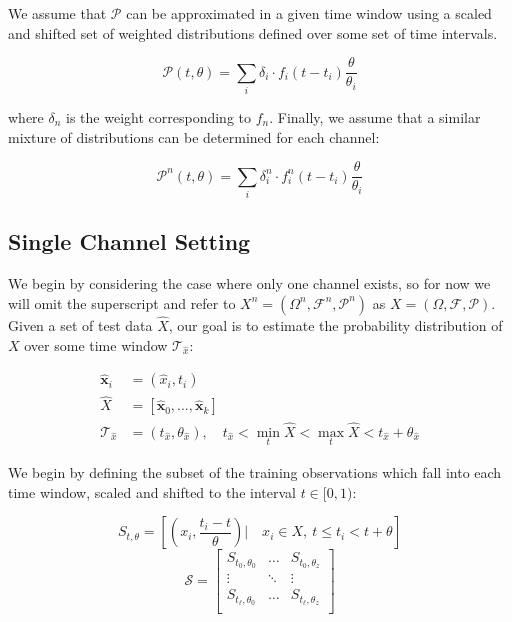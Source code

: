 \documentclass[10pt]{article}
\begin{document}
We assume that \( \mathcal{P} \) can be approximated in a given time window using a scaled and shifted set of weighted distributions defined over some set of time intervals.

\begin{equation} \mathcal{P}(t,\theta) = \sum_i \delta_i \cdot f_i(t - t_i) \frac{\theta}{\theta_i} \end{equation}

where \( \delta_n \) is the weight corresponding to \( f_n \).  Finally, we assume that a similar mixture of distributions can be determined for each channel:

\begin{equation} \mathcal{P}^n(t,\theta) = \sum_i \delta_i^n \cdot f_i^n(t - t_i) \frac{\theta}{\theta_i} \end{equation}

\subsection{Single Channel Setting}
We begin by considering the case where only one channel exists, so for now we will omit the superscript and refer to \(X^n = (\Omega^n,\mathcal{F}^n,\mathcal{P}^n) \) as \(X = (\Omega, \mathcal{F},\mathcal{P}) \).  Given a set of test data \( \hat{X} \), our goal is to estimate the probability distribution of \( X \) over some time window \( \mathcal{T}_{\hat{x}} \):

\begin{align*}
\mathbf{\hat{x}}_i &= (\hat{x}_i,t_i) \\
\hat{X} &= [ \mathbf{\hat{x}}_0,\hdots,\mathbf{\hat{x}}_k ] \\
\mathcal{T}_{\hat{x}} &= (t_{\hat{x}}, \theta_{\hat{x}} ), \quad t_{\hat{x}} < \min_t \hat{X} < \max_t \hat{X} < t_{\hat{x}} + \theta_{\hat{x}}
\end{align*}

We begin by defining the subset of the training observations which fall into each time window, scaled and shifted to the interval \( t \in [0,1) \):

\begin{equation} \label{eq:Ssingle} S_{t,\theta} = \left[ \left( x_i,\frac{t_i - t}{\theta} \right) \Big| \quad x_i \in X, \ t \le t_i < t+\theta \right] \end{equation}
\[ \mathcal{S} = 
\begin{bmatrix} 
S_{t_0,\theta_0} & \hdots & S_{t_0,\theta_z} \\
\vdots & \ddots & \vdots \\
S_{t_\ell, \theta_0} & \hdots & S_{t_\ell, \theta_z} \\
\end{bmatrix}  
\]
\end{document}
